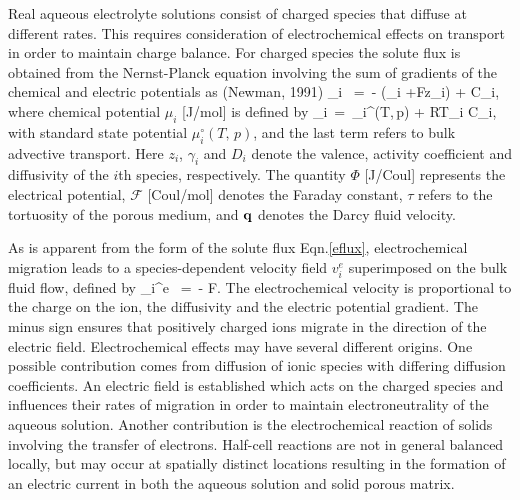 \documentclass[12pt]{article}
\def\EQ#1\EN{\begin{equation}#1\end{equation}}
\newcommand{\eq}{\ =\ }
\newcommand{\F}{{\mathcal F}}
\newcommand{\bnabla}{\boldsymbol{\nabla}}
\newcommand{\bF}{\boldsymbol{F}}
\newcommand{\bq}{\boldsymbol{q}}
\begin{document}
Real aqueous electrolyte solutions consist of charged species that diffuse at different rates. This requires consideration of electrochemical effects on transport in order to maintain charge balance. For charged species the solute flux is obtained from the Nernst-Planck equation involving the sum of gradients of the chemical and electric potentials as (Newman, 1991)
\EQ\label{eflux}
\bF_i \eq - \tau \phi {} \bnabla \big(\mu_i +\F z_i\Phi\big)
+ {\bq} C_i,
\EN
where  chemical potential $\mu_i$ [J/mol] is defined by
\EQ
\mu_i\eq\mu_i^\circ(T,\,p) + RT\ln \gamma_i C_i,
\EN
with standard state potential $\mu_i^\circ(T,\,p)$, and the last term refers to bulk advective transport. Here $z_i$, $\gamma_i$ and $D_i$ denote the valence, 
activity coefficient and diffusivity of the $i$th species, 
respectively. The quantity $\Phi$ [J/Coul] represents the electrical potential, $\F$ [Coul/mol] denotes the Faraday constant, $\tau$ refers to the 
tortuosity of the porous medium, and $\bf q$ denotes the Darcy fluid 
velocity. 

As is apparent from the form of the solute flux Eqn.\eqref{eflux}, electrochemical 
migration leads to a species-dependent velocity field $v_i^e$ superimposed on the bulk fluid flow, 
defined by
\EQ
v_i^e \eq - \tau \phi {} \F \nabla \Phi.
\EN
The electrochemical velocity is proportional to the charge on the ion, the diffusivity and the electric potential gradient. The minus sign ensures that positively charged ions migrate in the direction of the electric field. Electrochemical effects may have several different origins. One possible contribution comes from diffusion of ionic species with differing diffusion coefficients. An electric field is established which acts on the charged species and influences their rates of migration in order to maintain electroneutrality of the aqueous solution. Another contribution is the electrochemical reaction of solids involving the transfer of electrons. Half-cell reactions are not in general balanced locally, but may occur at spatially distinct locations resulting in the formation of an electric current in both the aqueous solution and solid porous matrix. 
\end{document}
